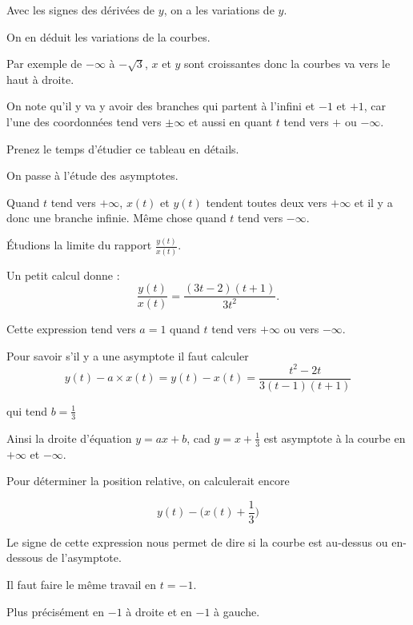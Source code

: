 Avec les signes des dérivées de $y$, on a les variations de $y$.

On en déduit les variations de la courbes.


Par exemple de $-\infty$ à $-\sqrt3$, $x$ et $y$ sont croissantes donc la courbes
va vers le haut à droite.
  

On note qu'il y va y avoir des branches qui partent à l'infini
et $-1$ et $+1$, car l'une des coordonnées tend vers $\pm \infty$
et aussi en quant $t$ tend vers $+$ ou $-\infty$.

Prenez le temps d'étudier ce tableau en détails.


\diapo


On passe à l'étude des asymptotes.

\change

Quand $t$ tend vers $+\infty$, $x(t)$ et $y(t)$ tendent 
toutes deux vers $+\infty$ et il y a donc une branche infinie.
Même chose quand $t$ tend vers $-\infty$.

\change

\'Etudions la limite du rapport $\frac{y(t)}{x(t)}$.

Un petit calcul donne :
$$\frac{y(t)}{x(t)} =\frac{(3t-2)(t+1)}{3t^2}.$$

Cette expression tend vers $a=1$ quand $t$ tend vers $+\infty$ ou
vers $-\infty$.

\change  
Pour savoir s'il y a une asymptote il faut calculer
  $$y(t)-a\times x(t) = y(t)-x(t)=\frac{t^2-2t}{3(t-1)(t+1)}$$
  
  qui tend $b=\tfrac{1}{3}$
  
\change
Ainsi la droite d'équation $y=ax+b$, cad $y=x+\frac{1}{3}$ est 
 asymptote à la courbe en $+\infty$ et $-\infty$.


\change 

Pour déterminer la position relative, on calculerait encore %

$$y(t)-\big(x(t)+\frac{1}{3}\big)$$


Le signe de cette expression nous permet de dire si la courbe
est au-dessus ou en-dessous de l'asymptote.

\change  

Il faut faire le même travail en $t=-1$.

Plus précisément en $-1$ à droite et en $-1$ à gauche.

\change

